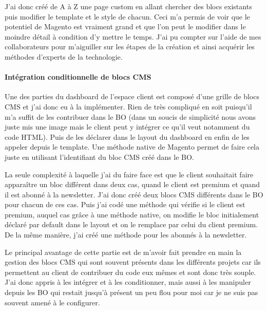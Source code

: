\documentclass[a4paper,11pt,twoside]{report}
\begin{document}
    	J'ai donc créé de A à Z une page custom en allant chercher des blocs existants puis modifier le template et le style de chacun. Ceci m'a permis de voir que le potentiel de Magento est vraiment grand et que l'on peut le modifier dans le moindre détail à condition d'y mettre le temps. J'ai pu compter sur l'aide de mes collaborateurs pour m'aiguiller sur les étapes de la création et ainsi acquérir les méthodes d'experts de la technologie.
    	\paragraph*{Intégration conditionnelle de blocs CMS}
    	Une des parties du dashboard de l'espace client est composé d'une grille de blocs CMS et j'ai donc eu à la implémenter. Rien de très compliqué en soit puisqu'il m'a suffit de les contribuer dans le BO (dans un soucis de simplicité nous avons juste mis une image mais le client peut y intégrer ce qu'il veut notamment du code HTML). Puis de les déclarer dans le layout du dashboard en enfin de les appeler depuis le template. Une méthode native de Magento permet de faire cela juste en utilisant l'identifiant du bloc CMS créé dans le BO. 
	
	\label{SL_layout_custom_loyalty}
	
	
	La seule complexité à laquelle j'ai du faire face est que le client souhaitait faire apparaître un bloc différent dans deux cas, quand le client est premium et quand il est abonné à la newsletter. J'ai donc créé deux blocs CMS différents dans le BO pour chacun de ces cas. Puis j'ai codé une méthode qui vérifie si le client est premium, auquel cas grâce à une méthode native, on modifie le bloc initialement déclaré par default dans le layout et on le remplace par celui du client premium. De la même manière, j'ai créé une méthode pour les abonnés à la newsletter.
	
	\label{SL_block_CMS_call_in_template}
	
	
	\label{SL_method_to_select_CMS_block}
	
		
	Le principal avantage de cette partie est de m'avoir fait prendre en main la gestion des blocs CMS qui sont souvent présents dans les différents projets car ils permettent au client de contribuer du code eux mêmes et sont donc très souple. J'ai donc appris à les intégrer et à les conditionner, mais aussi à les manipuler depuis les BO qui restait jusqu'à présent un peu flou pour moi car je ne suis pas souvent amené à le configurer.
\end{document}
